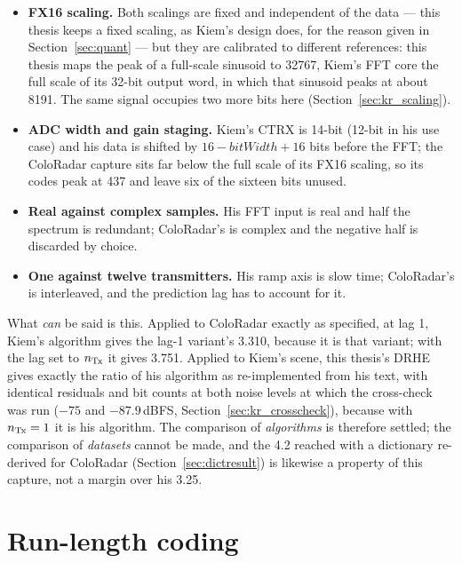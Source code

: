 \begin{itemize}
\item \textbf{FX16 scaling.} Both scalings are fixed and independent of the
data --- this thesis keeps a fixed scaling, as Kiem's design does, for the
reason given in Section~\ref{sec:quant} --- but they are calibrated to
different references: this
thesis maps the peak of a full-scale sinusoid to \num{32767}, Kiem's FFT core
the full scale of its 32-bit output word, in which that sinusoid peaks at about
\num{8191}. The same signal occupies two more bits here
(Section~\ref{sec:kr_scaling}).
\item \textbf{ADC width and gain staging.} Kiem's CTRX is 14-bit (12-bit in his
use case) and his data is shifted by $16 - \mathit{bitWidth} + 16$ bits before
the FFT; the ColoRadar capture sits far below the full scale of its FX16
scaling, so its codes peak at 437 and leave six of the sixteen bits unused.
\item \textbf{Real against complex samples.} His FFT input is real and half the
spectrum is redundant; ColoRadar's is complex and the negative half is
discarded by choice.
\item \textbf{One against twelve transmitters.} His ramp axis is slow time;
ColoRadar's is interleaved, and the prediction lag has to account for it.
\end{itemize}

\noindent
What \emph{can} be said is this. Applied to ColoRadar exactly as specified, at
lag 1, Kiem's algorithm gives the lag-1 variant's \num{3.310}, because it is
that variant; with the lag set to $n_{\mathrm{Tx}}$ it gives \num{3.751}. Applied to
Kiem's scene, this thesis's DRHE gives exactly the ratio of his algorithm as
re-implemented from his text, with identical residuals and bit counts at both
noise levels at which the cross-check was run ($-75$ and $-87.9$\,dBFS,
Section~\ref{sec:kr_crosscheck}), because with $n_{\mathrm{Tx}} = 1$ it is his
algorithm. The comparison of
\emph{algorithms} is therefore settled; the comparison of \emph{datasets} cannot
be made, and the \num{4.2} reached with a dictionary re-derived for ColoRadar
(Section~\ref{sec:dictresult}) is likewise a property of this capture, not a
margin over his \num{3.25}.

\section{Run-length coding}
\label{sec:kc_rle}

